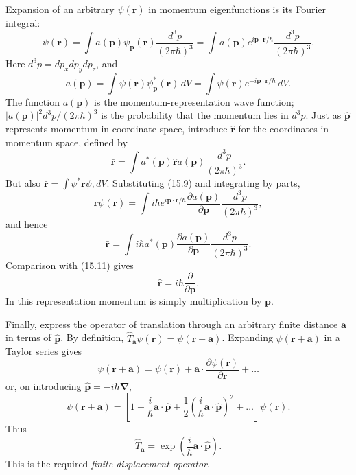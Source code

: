 Expansion of an arbitrary $\psi(\mathbf r)$ in momentum eigenfunctions is its
Fourier integral:
\begin{equation}
 \psi(\mathbf r)=\int a(\mathbf p)\psi_{\mathbf p}(\mathbf r)
 \frac{d^3p}{(2\pi\hbar)^3}
 =\int a(\mathbf p)e^{i\mathbf p\cdot\mathbf r/\hbar}
 \frac{d^3p}{(2\pi\hbar)^3}.
 \tag{15.9}
\end{equation}
Here $d^3p=dp_xdp_ydp_z$, and
\begin{equation}
 a(\mathbf p)=\int\psi(\mathbf r)\psi_{\mathbf p}^*(\mathbf r)\,dV
 =\int\psi(\mathbf r)e^{-i\mathbf p\cdot\mathbf r/\hbar}\,dV.
 \tag{15.10}
\end{equation}
The function $a(\mathbf p)$ is the momentum-representation wave function;
$|a(\mathbf p)|^2d^3p/(2\pi\hbar)^3$ is the probability that the momentum lies
in $d^3p$.
Just as $\hat{\mathbf p}$ represents momentum in coordinate space, introduce
$\hat{\mathbf r}$ for the coordinates in momentum space, defined by
\begin{equation}
 \bar{\mathbf r}=\int a^*(\mathbf p)\hat{\mathbf r}a(\mathbf p)
 \frac{d^3p}{(2\pi\hbar)^3}.
 \tag{15.11}
\end{equation}
But also $\bar{\mathbf r}=\int\psi^*\mathbf r\psi,dV$. Substituting (15.9)
and integrating by parts,
\[
 \mathbf r\psi(\mathbf r)
 =\int i\hbar e^{i\mathbf p\cdot\mathbf r/\hbar}
 \frac{\partial a(\mathbf p)}{\partial\mathbf p}
 \frac{d^3p}{(2\pi\hbar)^3},
\]
and hence
\[
 \bar{\mathbf r}=\int i\hbar a^*(\mathbf p)
 \frac{\partial a(\mathbf p)}{\partial\mathbf p}
 \frac{d^3p}{(2\pi\hbar)^3}.
\]
Comparison with (15.11) gives
\begin{equation}
 \hat{\mathbf r}=i\hbar\frac{\partial}{\partial\mathbf p}.
 \tag{15.12}
\end{equation}
In this representation momentum is simply multiplication by $\mathbf p$.

Finally, express the operator of translation through an arbitrary finite
distance $\mathbf a$ in terms of $\hat{\mathbf p}$. By definition,
$\hat T_{\mathbf a}\psi(\mathbf r)=\psi(\mathbf r+\mathbf a)$. Expanding
$\psi(\mathbf r+\mathbf a)$ in a Taylor series gives
\[
 \psi(\mathbf r+\mathbf a)=\psi(\mathbf r)
 +\mathbf a\cdot\frac{\partial\psi(\mathbf r)}{\partial\mathbf r}+\ldots
\]
or, on introducing $\hat{\mathbf p}=-i\hbar\boldsymbol\nabla$,
\[
 \psi(\mathbf r+\mathbf a)=\left[1+\frac{i}{\hbar}\mathbf a\cdot\hat{\mathbf p}
 +\frac12\left(\frac{i}{\hbar}\mathbf a\cdot\hat{\mathbf p}\right)^2
 +\ldots\right]\psi(\mathbf r).
\]
Thus
\begin{equation}
 \hat T_{\mathbf a}=\exp\left(\frac{i}{\hbar}
 \mathbf a\cdot\hat{\mathbf p}\right).
 \tag{15.13}
\end{equation}
This is the required \textit{finite-displacement operator}.
